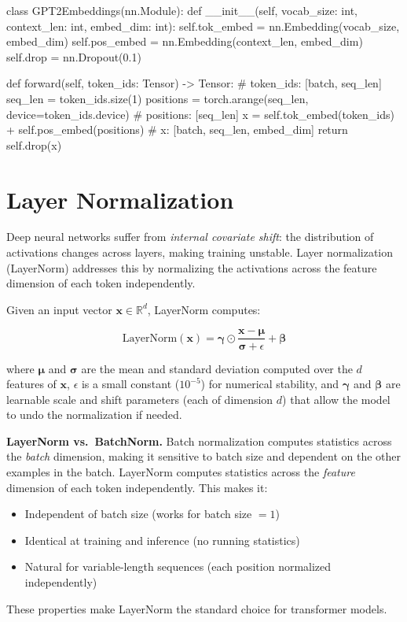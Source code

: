 \begin{pseudocode}
class GPT2Embeddings(nn.Module):
    def __init__(self, vocab_size: int, context_len: int, embed_dim: int):
        self.tok_embed = nn.Embedding(vocab_size, embed_dim)
        self.pos_embed = nn.Embedding(context_len, embed_dim)
        self.drop = nn.Dropout(0.1)

    def forward(self, token_ids: Tensor) -> Tensor:
        # token_ids: [batch, seq_len]
        seq_len = token_ids.size(1)
        positions = torch.arange(seq_len, device=token_ids.device)
        # positions: [seq_len]
        x = self.tok_embed(token_ids) + self.pos_embed(positions)
        # x: [batch, seq_len, embed_dim]
        return self.drop(x)
\end{pseudocode}

\section{Layer Normalization}

Deep neural networks suffer from \emph{internal covariate shift}: the
distribution of activations changes across layers, making training unstable.
Layer normalization (LayerNorm) addresses this by normalizing the activations
across the feature dimension of each token independently.

Given an input vector $\mathbf{x} \in \mathbb{R}^{d}$, LayerNorm computes:

\[
  \text{LayerNorm}(\mathbf{x}) = \boldsymbol{\gamma} \odot \frac{\mathbf{x} - \boldsymbol{\mu}}{\boldsymbol{\sigma} + \epsilon} + \boldsymbol{\beta}
\]

where $\boldsymbol{\mu}$ and $\boldsymbol{\sigma}$ are the mean and standard
deviation computed over the $d$ features of $\mathbf{x}$, $\epsilon$ is a
small constant ($10^{-5}$) for numerical stability, and
$\boldsymbol{\gamma}$ and $\boldsymbol{\beta}$ are learnable scale and shift
parameters (each of dimension $d$) that allow the model to undo the
normalization if needed.

\begin{keyconcept}
  \textbf{LayerNorm vs.\ BatchNorm.} Batch normalization computes statistics
  across the \emph{batch} dimension, making it sensitive to batch size and
  dependent on the other examples in the batch. LayerNorm computes statistics
  across the \emph{feature} dimension of each token independently. This makes
  it:
  \begin{itemize}
    \item Independent of batch size (works for batch size $= 1$)
    \item Identical at training and inference (no running statistics)
    \item Natural for variable-length sequences (each position normalized
          independently)
  \end{itemize}
  These properties make LayerNorm the standard choice for transformer models.
\end{keyconcept}

